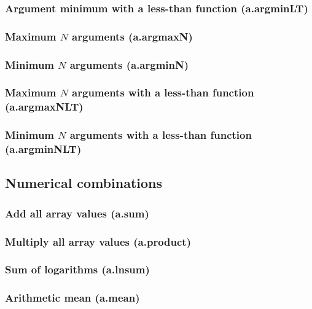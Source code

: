 \documentclass{article}
\theoremstyle{definition}
\begin{document}
\subsubsection{Argument minimum with a less-than function (a.argminLT)}

\subsubsection{Maximum $N$ arguments (a.argmaxN)}

\subsubsection{Minimum $N$ arguments (a.argminN)}

\subsubsection{Maximum $N$ arguments with a less-than function (a.argmaxNLT)}

\subsubsection{Minimum $N$ arguments with a less-than function (a.argminNLT)}

\subsection{Numerical combinations}

\subsubsection{Add all array values (a.sum)}

\subsubsection{Multiply all array values (a.product)}

\subsubsection{Sum of logarithms (a.lnsum)}

\subsubsection{Arithmetic mean (a.mean)}
\end{document}
